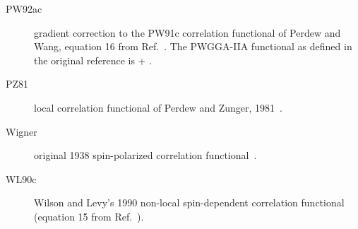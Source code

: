 \begin{description}
\item[PW92ac] gradient correction to the PW91c correlation functional of Perdew and Wang,
  equation 16 from Ref.~\cite{dft:pw91,dft:pw92}. The PWGGA-IIA functional
  as defined in the original reference is  + . 

\item[PZ81] local correlation functional of Perdew and Zunger, 1981~\cite{dft:pz81}.

\item[Wigner] original 1938 spin-polarized correlation functional~\cite{dft:wigner}.

\item[WL90c] Wilson and Levy's 1990 non-local spin-dependent correlation functional 
  (equation 15 from Ref.~\cite{dft:wl90}).

\end{description}

